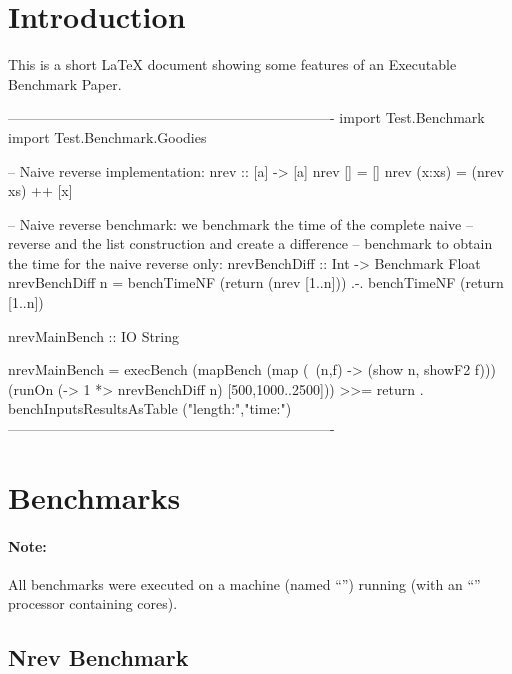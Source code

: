 \documentclass{article}
\begin{document}
\sloppy

\section{Introduction}

This is a short LaTeX document showing some features of an
Executable Benchmark Paper.

\begin{curryprog}
----------------------------------------------------------------------
import Test.Benchmark
import Test.Benchmark.Goodies

-- Naive reverse implementation:
nrev :: [a] -> [a]
nrev []     = []
nrev (x:xs) = (nrev xs) ++ [x]

-- Naive reverse benchmark: we benchmark the time of the complete naive
-- reverse and the list construction and create a difference
-- benchmark to obtain the time for the naive reverse only:
nrevBenchDiff :: Int -> Benchmark Float
nrevBenchDiff n =
  benchTimeNF (return (nrev [1..n]))  .-.  benchTimeNF (return [1..n])

nrevMainBench :: IO String

nrevMainBench =
  execBench (mapBench (map (\ (n,f) -> (show n, showF2 f)))
               (runOn (\n -> 1 *> nrevBenchDiff n) [500,1000..2500])) >>=
    return . benchInputsResultsAsTable ("length:","time:")
----------------------------------------------------------------------
\end{curryprog}

\section{Benchmarks}

\paragraph{Note:}
%
All benchmarks were executed on a  machine
(named ``'')
running  
(with an ``'' processor containing
 cores).

\subsection{Nrev Benchmark}

\begin{center}
\end{center}
\end{document}
